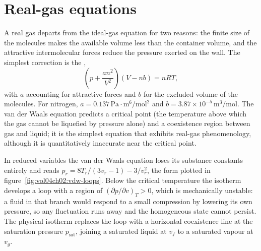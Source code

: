 \section{Real-gas equations}

A real gas departs from the ideal-gas equation for two reasons: the
finite size of the molecules makes the available volume less than the
container volume, and the attractive intermolecular forces reduce the
pressure exerted on the wall. The simplest correction is the
,
\[
\left(p + \frac{a n^2}{V^2}\right)(V - nb) = nRT,
\]
with $a$ accounting for attractive forces and $b$ for the excluded
volume of the molecules. For nitrogen, $a = 0.137\,\text{Pa}\cdot
\text{m}^6/\text{mol}^2$ and $b = 3.87 \times 10^{-5}\,\text{m}^3/
\text{mol}$. The van der Waals equation predicts a critical point
(the temperature above which the gas cannot be liquefied by pressure
alone) and a coexistence region between gas and liquid; it is the
simplest equation that exhibits real-gas phenomenology, although it
is quantitatively inaccurate near the critical point.



In reduced variables the van der Waals equation loses its substance
constants entirely and reads $p_r = 8T_r/(3v_r - 1) - 3/v_r^2$, the form
plotted in figure~\ref{fig:vol04ch02:vdw-loops}. Below the critical
temperature the isotherm develops a loop with a region of $(\partial
p/\partial v)_T > 0$, which is mechanically unstable: a fluid in that
branch would respond to a small compression by lowering its own pressure,
so any fluctuation runs away and the homogeneous state cannot persist. The
physical isotherm replaces the loop with a horizontal coexistence line at
the saturation pressure $p_{\text{sat}}$, joining a saturated liquid at
$v_f$ to a saturated vapour at $v_g$.

